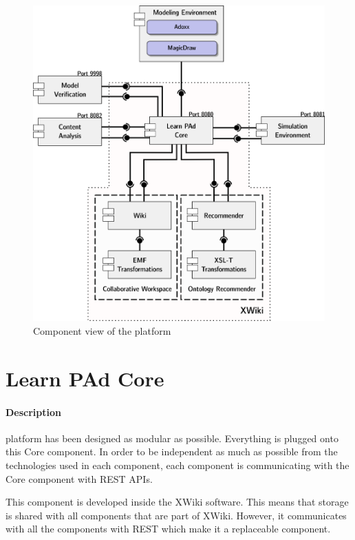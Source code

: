 \documentclass{learnpad}
\begin{document}
\begin{figure}[!htp]
	\centering
	\includegraphics[width=.6\paperwidth,keepaspectratio]{figures/component-view.png}
	\caption{Component view of the \learnpad platform}
	\label{fig:component-view}
\end{figure}

\section{Learn PAd Core}\label{sec:core}
\paragraph{Description}
\learnpad platform has been designed as modular as possible.  Everything is
plugged onto this \learnpad Core component.  In order to be independent as much
as possible from the technologies used in each component, each component is
communicating with the \learnpad Core component with REST APIs.

This component is developed inside the XWiki software.  This means that storage
is shared with all components that are part of XWiki.  However, it communicates
with all the components with REST which make it a replaceable component.
\end{document}
